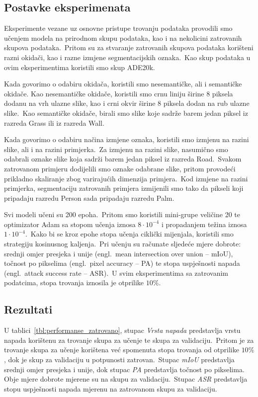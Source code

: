 \documentclass[times, utf8, seminar, numeric]{fer}
\begin{document}
\subsection{Postavke eksperimenata}

Eksperimente vezane uz osnovne pristupe trovanju podataka provodili smo učenjem modela na prirodnom skupu podataka, kao i na nekolicini zatrovanih skupova podataka.\ 
Pritom su za stvaranje zatrovanih skupova podataka korišteni razni okidači, kao i razne izmjene segmentacijskih oznaka.\ Kao skup podataka u ovim eksperimentima koristili smo skup ADE20k.\ 
  
Kada govorimo o odabiru okidača, koristili smo nesemantičke, ali i semantičke okidače.
Kao nesemantičke okidače, koristili smo crnu liniju širine 8 piksela dodanu na vrh ulazne slike, kao i crni okvir širine 8 piksela dodan na rub ulazne slike.\ 
Kao semantičke okidače, birali smo slike koje sadrže barem jedan piksel iz razreda Grass ili iz razreda Wall.\ 
  
Kada govorimo o odabiru načina izmjene oznaka, koristili smo izmjenu na razini slike, ali i na razini primjerka.\ 
Za izmjenu na razini slike, nasumično smo odabrali oznake slike koja sadrži barem jedan piksel iz razreda Road.\ 
Svakom zatrovanom primjeru dodijelili smo oznake odabrane slike, pritom provodeći prikladno skaliranje zbog varirajućih dimenzija primjera.\ 
Kod izmjene na razini primjerka, segmentaciju zatrovanih primjera izmijenili smo tako da pikseli koji pripadaju razredu Person sada pripadaju razredu Palm.
  
Svi modeli učeni su 200 epoha.\ Pritom smo koristili mini-grupe veličine 20 te optimizator Adam sa stopom učenja iznosa $8 \cdot 10^{-4}$ i propadanjem težina iznosa $1 \cdot 10^{-4}$.\
Kako bi se kroz epohe stopa učenja ciklički mijenjala, koristili smo strategiju kosinusnog kaljenja.\ 
Pri učenju su računate sljedeće mjere dobrote: srednji omjer presjeka i unije (engl.\ mean intersection over union – mIoU), točnost po pikselima (engl.\ pixel accuracy – PA) te stopa uspješnosti napada (engl.\ attack success rate – ASR).\ 
U svim eksperimentima sa zatrovanim podatcima, stopa trovanja iznosila je otprilike $10\%$. 

\subsection{Rezultati}

U tablici~\ref{tbl:performanse_zatrovano}, stupac \textit{Vrsta napada} predstavlja vrstu napada korištenu za trovanje skupa za učenje te skupa za validaciju.\ 
Pritom je za trovanje skupa za učenje korištena već spomenuta stopa trovanja od otprilike $10\%$, dok je skup za validaciju u potpunosti zatrovan.\ 
Stupac \textit{mIoU} predstavlja srednji omjer presjeka i unije, dok stupac \textit{PA} predstavlja točnost po pikselima. Obje mjere dobrote mjerene su na skupu za validaciju.\ 
Stupac \textit{ASR} predstavlja stopu uspješnosti napada mjerenu na zatrovanom skupu za validaciju.
\end{document}
